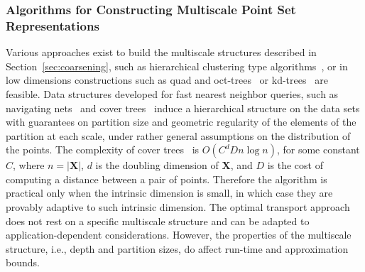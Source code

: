 \documentclass[twoside,11pt]{article}
\newcommand{\Xsp}{{\mathbf{X}}}
\begin{document}
\subsubsection{Algorithms for Constructing Multiscale Point Set Representations}
\label{s:multiscalepointsets}
Various approaches exist to build the multiscale structures described
in Section~\ref{sec:coarsening}, such as hierarchical clustering
type algorithms~\citep{ward:jasa1963}, or in low dimensions constructions such
as quad and oct-trees~\citep{finkel:ai197,jackins:cgip1980} or
kd-trees~\citep{bentley:acm1975} are feasible. Data structures developed for
fast nearest neighbor queries, such as navigating
nets~\citep{krauthgamer:soda2004} and cover trees~\citep{beygelzimer:icml2006}
induce a hierarchical structure on the data sets with guarantees on partition
size and geometric regularity of the elements of the partition at each scale,
under rather general assumptions on the distribution of the points.  The
complexity of cover trees~\citep{beygelzimer:icml2006} is $O(C^d D n\log n)$,
for some constant $C$, where $n=|{\Xsp}|$, $d$ is the doubling dimension of
${\Xsp}$, and $D$ is the cost of computing a distance between a pair of points.
Therefore the algorithm is practical only when the intrinsic dimension is
small, in which case they are provably adaptive to such intrinsic dimension.
The optimal transport approach does not rest on a specific multiscale structure
and can be adapted to application-dependent considerations. However, the
properties of the multiscale structure, i.e., depth and partition sizes, do
affect run-time and approximation bounds.
\end{document}
